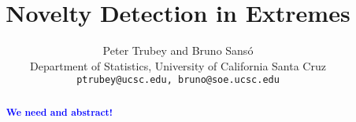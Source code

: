 \documentclass[12pt]{article}
\title{Novelty Detection in Extremes}
\author{Peter Trubey and Bruno Sans\'o\\
Department of Statistics, University of California Santa Cruz\\
{\tt ptrubey@ucsc.edu, bruno@soe.ucsc.edu}}
\newcommand{\add}[1]{\textcolor{blue}{#1}}
\begin{document}
\maketitle
\thispagestyle{empty}
\begin{abstract}
  ~%
  \add{\bf{We need and abstract!}}
\end{abstract}








% 













\end{document}
